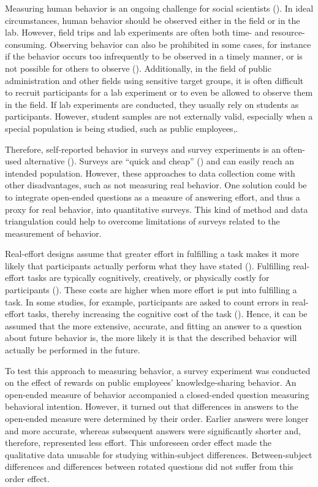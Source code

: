 \documentclass[twocolumn, serif, empirical, authordate]{jote-article}
\begin{document}
Measuring human behavior is an ongoing challenge for social scientists (). In ideal circumstances, human behavior should be observed either in the field or in the lab. However, field trips and lab experiments are often both time- and resource-consuming.
Observing behavior can also be prohibited in some cases, for instance if the behavior occurs too infrequently to be observed in a timely manner, or is not possible for others to observe (). Additionally, in the field of public administration and other fields using sensitive target groups, it is often difficult to recruit participants for a lab experiment or to even be allowed to observe them in the field. If lab experiments are conducted, they usually rely on students as participants. However, student samples are not externally valid, especially when a special population is being studied, such as public employees,.

Therefore, self-reported behavior in surveys and survey experiments is an often-used alternative (). Surveys are ``quick and cheap'' () and can easily reach an intended population. However, these approaches to data collection come with other disadvantages, such as not measuring real behavior. One solution could be to integrate open-ended questions as a measure of answering effort, and thus a proxy for real behavior, into quantitative surveys. This kind of method and data triangulation could help to overcome limitations of surveys related to the measurement of behavior.

Real-effort designs assume that greater effort in fulfilling a task makes it more likely that participants actually perform what they have stated (). Fulfilling real-effort tasks are typically cognitively, creatively, or physically costly for participants (). These costs are higher when more effort is put into fulfilling a task. In some studies, for example, participants are asked to count errors in real-effort tasks, thereby increasing the cognitive cost of the task (). Hence, it can be assumed that the more extensive, accurate, and fitting an answer to a question about future behavior is, the more likely it is that the described behavior will actually be performed in the future.

To test this approach to measuring behavior, a survey experiment was conducted on the effect of rewards on public employees' knowledge-sharing behavior. An open-ended measure of behavior accompanied a closed-ended question measuring behavioral intention.
However, it turned out that differences in answers to the open-ended measure were determined by their order. Earlier answers were longer and more accurate, whereas subsequent answers were significantly shorter and, therefore, represented less effort. This unforeseen order effect made the qualitative data unusable for studying within-subject differences. Between-subject differences and differences between rotated questions did not suffer from this order effect.
\end{document}
